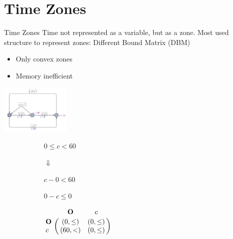 \section{Time Zones}


\begin{frame}{Time Zones}
Time not represented as a variable, but as a zone. Most used structure to represent zones: Different Bound Matrix (DBM)
\begin{itemize}
	\item Only convex zones
	\item Memory inefficient
\end{itemize}
\begin{center}
\includegraphics[width=0.25\textwidth]{img/TA}
\end{center}
\begin{figure}
\centering
	\begin{subfigure}{0.3\textwidth}
	\centering
		$0 \leq c < 60$
		
		$\Downarrow$		
		
		$c - 0 < 60$
		
		$0 - c \leq 0 $
	\end{subfigure}
	\begin{subfigure}{0.3\textwidth}
	\begin{math}
 \bordermatrix{ 	   & \mathbf{O}    & c         \cr
 			\mathbf{O} &(0,\leq)       & (0,\leq)  \cr
 			c          &(60,<   )      & (0,\leq)  \cr}
	\end{math}
	\end{subfigure}
\end{figure}
\end{frame}

